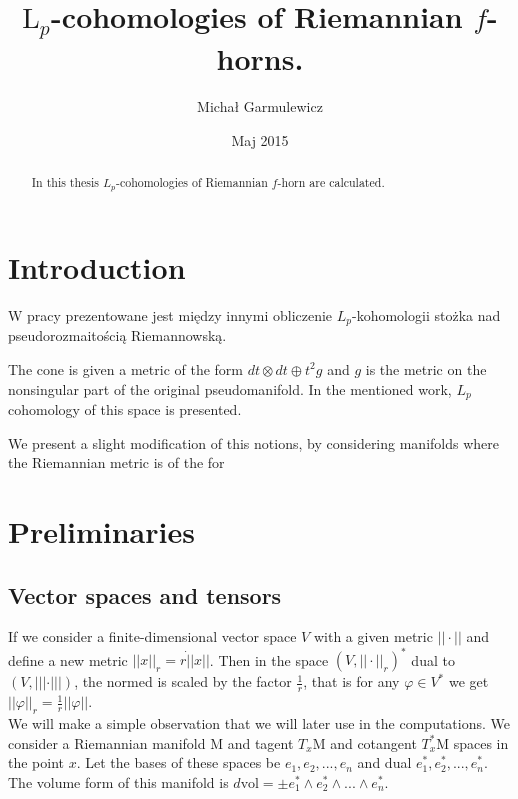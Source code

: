 \documentclass[licencjacka]{pracamgr}
\author{Michał Garmulewicz}
\title{$\mathrm{L}_p$-cohomologies of Riemannian $f$-horns.}
\date{Maj 2015}
\theoremstyle{definition}
\theoremstyle{definition}
\theoremstyle{plain}
\theoremstyle{plain}
\begin{document}
\maketitle

\begin{abstract}
  In this thesis $L_p$-cohomologies of Riemannian $f$-horn are calculated.
\end{abstract}

\tableofcontents

\chapter{Introduction}

W pracy \cite{weber} prezentowane jest między innymi obliczenie
$L_p$-kohomologii stożka nad pseudorozmaitością Riemannowską.

The cone is given a metric of the form $dt \otimes dt
\oplus t^2 g$ and $g$ is the metric on the nonsingular part of the
original pseudomanifold. In the mentioned work, $L_p$ cohomology of
this space is presented.


 We present a slight modification of this notions, by considering
 manifolds where the Riemannian metric is of the for

\chapter{Preliminaries}
\section{Vector spaces and tensors}
If we consider a finite-dimensional vector space $V$ with a given metric $||
\cdot ||$ and define a new metric $|| x ||_r  = r \dot || x ||$. Then in the
space $(V, || \cdot||_r)^\ast$ dual to $(V, ||| \cdot |||)$, the normed is scaled
by the factor $\frac{1}{r}$, that is for any $\varphi \in V^\ast$ we get
$||\varphi||_r = \frac{1}{r} ||\varphi|| $. \\

We will make a simple observation that we will later use in the
computations.  We consider a Riemannian manifold $\mathrm{M}$ and
tagent $T_x\mathrm{M}$ and cotangent $T_x^\ast\mathrm{M}$ spaces in
the point $x$.  Let the bases of these spaces be $e_1, e_2, ..., e_n$
and dual $e_1^\ast, e_2^\ast, ..., e_n^\ast$. The volume form of this
manifold is $d\mathrm{vol} = \pm e_1^\ast \wedge e_2^\ast \wedge
... \wedge e_n^\ast $. \\
\end{document}
